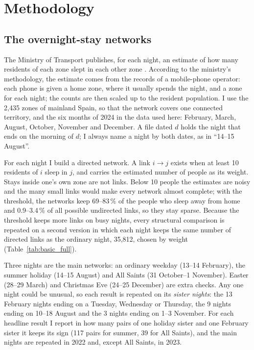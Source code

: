 \section{Methodology}\label{sec:method}

\subsection{The overnight-stay networks}

The Ministry of Transport publishes, for each night, an estimate of how many residents of each zone slept in each other zone \citep{mitms2024methodology}. According to the ministry's methodology, the estimate comes from the records of a mobile-phone operator: each phone is given a home zone, where it usually spends the night, and a zone for each night; the counts are then scaled up to the resident population. I use the 2,435 zones of mainland Spain, so that the network covers one connected territory, and the six months of 2024 in the data used here: February, March, August, October, November and December. A file dated $d$ holds the night that ends on the morning of $d$; I always name a night by both dates, as in ``14--15 August''.

For each night I build a directed network. A link $i\to j$ exists when at least 10 residents of $i$ sleep in $j$, and carries the estimated number of people as its weight. Stays inside one's own zone are not links. Below 10 people the estimates are noisy and the many small links would make every network almost complete; with the threshold, the networks keep 69--83\,\% of the people who sleep away from home and 0.9--3.4\,\% of all possible undirected links, so they stay sparse. Because the threshold keeps more links on busy nights, every structural comparison is repeated on a second version in which each night keeps the same number of directed links as the ordinary night, 35,812, chosen by weight (Table~\ref{tab:basic_full}).

Three nights are the main networks: an ordinary weekday (13--14 February), the summer holiday (14--15 August) and All Saints (31 October--1 November). Easter (28--29 March) and Christmas Eve (24--25 December) are extra checks. Any one night could be unusual, so each result is repeated on its \emph{sister nights}: the 13 February nights ending on a Tuesday, Wednesday or Thursday, the 9 nights ending on 10--18 August and the 3 nights ending on 1--3 November. For each headline result I report in how many pairs of one holiday sister and one February sister it keeps its sign (117 pairs for summer, 39 for All Saints), and the main nights are repeated in 2022 and, except All Saints, in 2023.

